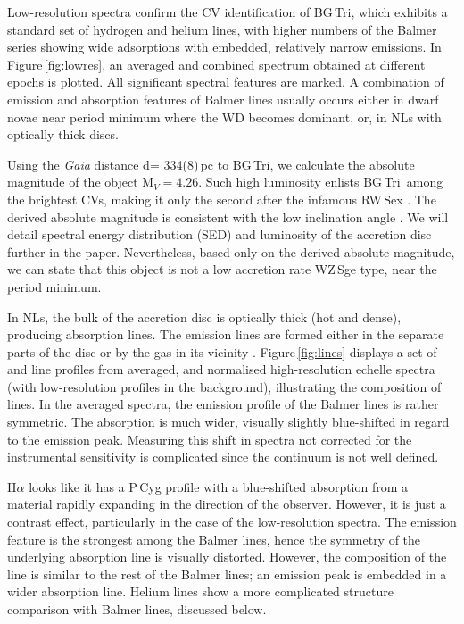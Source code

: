 \documentclass[fleqn,usenatbib]{mnras}
\def\bg{BG\,Tri}
\begin{document}
Low-resolution spectra confirm the CV identification of \bg, which exhibits a standard set of hydrogen and helium lines, with higher numbers
of the Balmer series showing wide adsorptions with embedded, relatively narrow emissions. In Figure\,\ref{fig:lowres}, an averaged and
combined spectrum obtained at different epochs is plotted. All significant spectral features are marked. 
A combination of emission and absorption features of Balmer lines  usually occurs  either in dwarf novae near period minimum  where the WD becomes dominant, or, in NLs with optically thick discs. 

Using the {\it Gaia} distance d= 334(8)\,pc to \bg,   we calculate the absolute magnitude of the object M$_V=4.26$. 
Such high luminosity enlists \bg\ among the brightest CVs, making it only the second after the infamous RW\,Sex \citep{2020MNRAS.496.2542H}.
The derived absolute magnitude is consistent with the  low inclination angle \citep{1986MNRAS.222...11W,1987MNRAS.227...23W}.  We will detail spectral energy distribution (SED) and luminosity of the accretion disc further in the paper. Nevertheless, based  only on the derived absolute magnitude, we can state that this object is not a low accretion rate WZ\,Sge type,  near the period minimum. 


In NLs, the bulk of the accretion disc is optically thick (hot and dense), producing absorption lines.  The emission lines are formed either in the separate parts of the disc or by the gas in its vicinity \citep{warner_1976,1992A&A...256..433B}. Figure\,\ref{fig:lines} displays a set 
of  and  line profiles from averaged, and normalised high-resolution echelle spectra (with low-resolution profiles in 
the background), illustrating the composition of lines. In the averaged spectra, the emission profile of the Balmer lines  is   rather symmetric.
The absorption  is much wider,  visually slightly blue-shifted in regard to the emission peak. Measuring this shift in spectra not corrected for the instrumental sensitivity is complicated since the continuum is not well defined.

H$\alpha$ looks like it has a P\,Cyg profile with a blue-shifted absorption  from a material rapidly expanding in the direction of the
observer. However, it is just a contrast effect, particularly in the case of the low-resolution spectra. The emission feature is the 
strongest among the Balmer lines, hence the symmetry of the underlying absorption line is visually distorted. However, the composition of the 
line is similar to the rest of the Balmer lines; an emission peak is embedded in a wider absorption line.  
Helium lines show a more complicated structure comparison with Balmer lines, discussed below.
\end{document}
